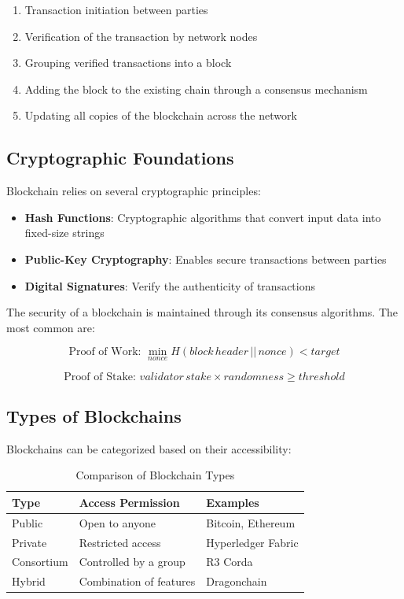 \documentclass[11pt,a4paper]{article}
\begin{document}
\begin{enumerate}
    \item Transaction initiation between parties
    \item Verification of the transaction by network nodes
    \item Grouping verified transactions into a block
    \item Adding the block to the existing chain through a consensus mechanism
    \item Updating all copies of the blockchain across the network
\end{enumerate}

\subsection{Cryptographic Foundations}
Blockchain relies on several cryptographic principles:

\begin{itemize}
    \item \textbf{Hash Functions}: Cryptographic algorithms that convert input data into fixed-size strings
    \item \textbf{Public-Key Cryptography}: Enables secure transactions between parties
    \item \textbf{Digital Signatures}: Verify the authenticity of transactions
\end{itemize}

The security of a blockchain is maintained through its consensus algorithms. The most common are:

\begin{equation}
\text{Proof of Work: } \min_{nonce} H(block\,header\,||\,nonce) < target
\end{equation}

\begin{equation}
\text{Proof of Stake: } validator\,stake \times randomness \geq threshold
\end{equation}

\subsection{Types of Blockchains}
Blockchains can be categorized based on their accessibility:

\begin{table}[h]
\centering
\caption{Comparison of Blockchain Types}
\begin{tabular}{|p{3cm}|p{4cm}|p{4cm}|}
\hline
\textbf{Type} & \textbf{Access Permission} & \textbf{Examples} \\
\hline
Public & Open to anyone & Bitcoin, Ethereum \\
\hline
Private & Restricted access & Hyperledger Fabric \\
\hline
Consortium & Controlled by a group & R3 Corda \\
\hline
Hybrid & Combination of features & Dragonchain \\
\hline
\end{tabular}
\label{tab:blockchain_types}
\end{table}
\end{document}
